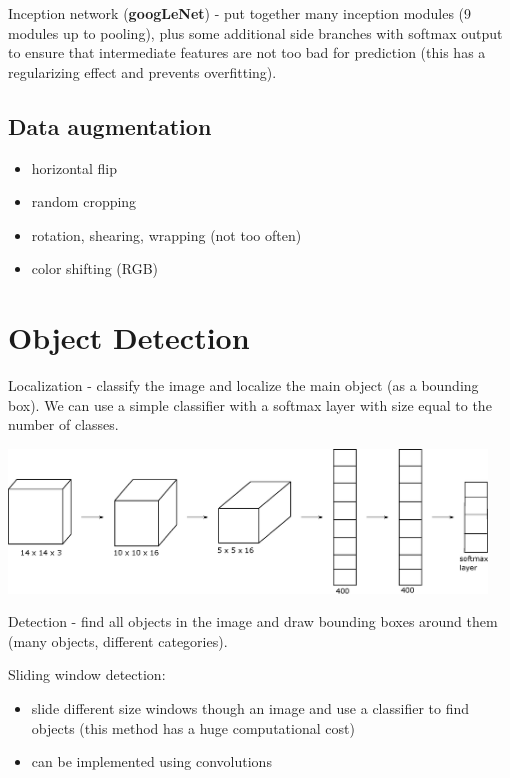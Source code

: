 \documentclass[a4paper,11pt]{report}
\begin{document}
Inception network (\textbf{googLeNet}) - put together many inception modules (9 modules up to pooling), plus some additional side branches with softmax output to ensure that intermediate features are not too bad for prediction (this has a regularizing effect and prevents overfitting).


\subsection*{Data augmentation}

\begin{itemize}
  \item horizontal flip
  \item random cropping
  \item rotation, shearing, wrapping (not too often)
  \item color shifting (RGB)
\end{itemize}


\section{Object Detection}

Localization - classify the image and localize the main object (as a bounding box). We can use a simple classifier with a softmax layer with size equal to the number of classes.

\begin{center}
\includegraphics[width = 5in]{convolutions/classifier}
\end{center}

Detection - find all objects in the image and draw bounding boxes around them (many objects, different categories).

Sliding window detection:
\begin{itemize}
  \item slide different size windows though an image and use a classifier to find objects (this method has a huge computational cost)
  \item can be implemented using convolutions
\end{itemize}
\end{document}
